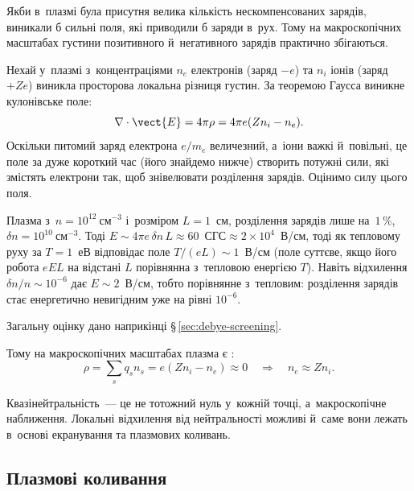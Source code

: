 Якби в~плазмі була присутня велика кількість нескомпенсованих зарядів, виникали б сильні
поля, які приводили б заряди в~рух. Тому на макроскопічних масштабах густини позитивного
й~негативного зарядів практично збігаються.

Нехай у~плазмі з~концентраціями $n_e$ електронів (заряд $-e$) та $n_i$ іонів (заряд $+Ze$)
виникла просторова локальна різниця густин. За теоремою Гаусса виникне кулонівське поле:
\begin{equation}
	\nabla \cdot \vect{E} = 4\pi \rho = 4\pi e (Z n_i - n_e).
\end{equation}
Оскільки питомий заряд електрона $e/m_e$ величезний, а~іони важкі й~повільні, це поле за дуже короткий час
(його знайдемо нижче) створить потужні сили, які змістять електрони так, щоб знівелювати
розділення зарядів. Оцінимо силу цього поля.
\begin{Estimate}
Плазма з~$n=10^{12}~\mathrm{см}^{-3}$ і~розміром $L=1$~см, розділення зарядів лише на~$1\,\%$, $\delta n=10^{10}~\mathrm{см}^{-3}$.
Тоді $E\sim4\pi e\,\delta n\,L\approx60$~СГС$\approx2\times10^{4}$~В/см, тоді як тепловому руху за $T=1$~еВ відповідає поле $T/(eL)\sim1$~В/см (поле суттєве, якщо його робота
$eEL$ на відстані $L$ порівнянна з~тепловою енергією $T$).
Навіть відхилення $\delta n/n\sim10^{-6}$ дає $E\sim2$~В/см, тобто порівнянне з~тепловим: розділення зарядів стає енергетично невигідним уже на рівні $10^{-6}$.
\end{Estimate}
Загальну оцінку дано наприкінці §\,\ref{sec:debye-screening}.

Тому на макроскопічних масштабах плазма є :
\begin{equation}\label{eq:quasineutrality}
	\rho = \sum_s q_s n_s = e(Z n_i - n_e) \approx 0 \quad \Rightarrow \quad n_e \approx Z n_i.
\end{equation}
\begin{Attention}
	Квазінейтральність~--- це не тотожний нуль у~кожній точці, а~макроскопічне наближення.
	Локальні відхилення від нейтральності можливі й~саме вони лежать в~основі екранування
	та плазмових коливань.
\end{Attention}

\subsection*{Плазмові коливання}\label{sec:plasma-oscillations}

